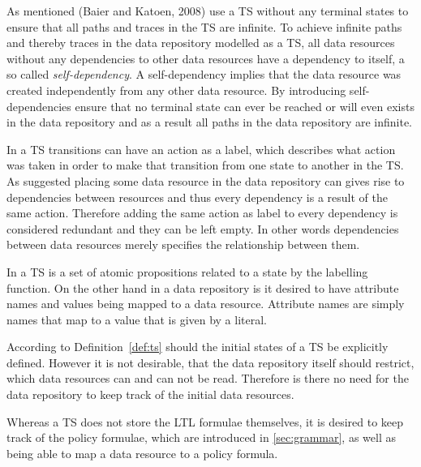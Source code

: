As mentioned (Baier and Katoen, 2008)\cite{baier2008principles} use a TS without any terminal states to ensure that all paths and traces in the TS are infinite. To achieve infinite paths and thereby traces in the data repository modelled as a TS, all data resources without any dependencies to other data resources have a dependency to itself, a so called \emph{self-dependency}. A self-dependency implies that the data resource was created independently from any other data resource. By introducing self-dependencies ensure that no terminal state can ever be reached or will even exists in the data repository and as a result all paths in the data repository are infinite.

In a TS transitions can have an action as a label, which describes what action was taken in order to make that transition from one state to another in the TS. As suggested placing some data resource in the data repository can gives rise to dependencies between resources and thus every dependency is a result of the same action. Therefore adding the same action as label to every dependency is considered redundant and they can be left empty. In other words dependencies between data resources merely specifies the relationship between them.

In a TS is a set of atomic propositions related to a state by the labelling function. On the other hand in a data repository is it desired to have attribute names and values being mapped to a data resource. Attribute names are simply names that map to a value that is given by a literal.

According to Definition~\ref{def:ts} should the initial states of a TS be explicitly defined. However it is not desirable, that the data repository itself should restrict, which data resources can and can not be read. Therefore is there no need for the data repository to keep track of the initial data resources.

Whereas a TS does not store the LTL formulae themselves, it is desired to keep track of the policy formulae, which are introduced in \autoref{sec:grammar}, as well as being able to map a data resource to a policy formula.

